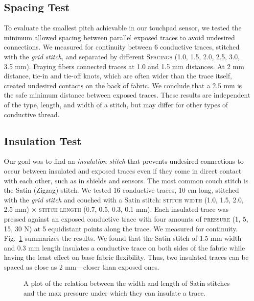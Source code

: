 \documentclass[header.tex]{subfiles}
\begin{document}
\subsection{Spacing Test} 
To evaluate the smallest pitch achievable in our touchpad sensor, we tested the minimum allowed spacing between parallel exposed traces to avoid undesired connections. We measured for continuity between 6 conductive traces, stitched with the \textit{grid stitch}, and separated by different \textsc{Spacings} (1.0, 1.5, 2.0, 2.5, 3.0, 3.5 mm). Fraying fibers connected traces at 1.0 and 1.5 mm distances. At 2 mm distance, tie-in and tie-off knots, which are often wider than the trace itself, created undesired contacts on the back of fabric. We conclude that a 2.5 mm is the safe minimum distance between exposed traces. These results are independent of the type, length, and width of a stitch, but may differ for other types of conductive thread. %

\subsection{Insulation Test}
Our goal was to find an \textit{insulation stitch} that prevents undesired connections to occur between insulated and exposed traces even if they come in direct contact with each other, such as in shields and sensors. The most common couch stitch is the Satin (Zigzag) stitch. 
 We tested 16 conductive traces, 10 cm long, stitched with the \textit{grid stitch} and couched with a Satin stitch: \textsc{stitch width} (1.0, 1.5, 2.0, 2.5 mm) $\times$ \textsc{stitch length} (0.7, 0.5, 0.3, 0.1 mm). Each insulated trace was pressed against an exposed conductive trace with four amounts of \textsc{pressure} (1, 5, 15, 30 N) at 5 equidistant points along the trace. We measured for continuity. Fig.\ \ref{fig:Insulation} summarizes the results. We found that the Satin stitch of 1.5 mm width and 0.3 mm length insulates a conductive trace on both sides of the fabric while having the least effect on base fabric flexibility. Thus, two insulated traces can be spaced as close as 2 mm---closer than exposed ones.


\begin{figure}[t!]
\vspace{-1em}
    \centering
    \resizebox{0.49\textwidth}{!}{
        
    }
    \caption{A plot of the relation between the width and length of Satin stitches and the max pressure under which they can insulate a trace.}
    \label{fig:Insulation}
    \vspace{-1.2em}
\end{figure}
\end{document}
